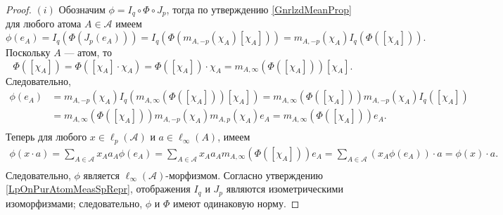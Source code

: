 \documentclass[12pt]{article}
\begin{document}
\begin{proof} 
    $(i)$ Обозначим $\phi=I_q\circ \Phi\circ J_p$, тогда по 
    утверждению \ref{GnrlzdMeanProp} для любого атома $A\in\mathcal{A}$ имеем
    \[
        \phi(e_A)
        =I_q(\Phi(J_p(e_A)))
        =I_q(\Phi(m_{A,-p}(\chi_A)[\chi_A]))
        =m_{A,-p}(\chi_A)I_q(\Phi([\chi_A])).
    \]
    Поскольку $A$ --- атом, то
    \[
        \Phi([\chi_A])
        =\Phi([\chi_A]\cdot\chi_A)
        =\Phi([\chi_A])\cdot\chi_A
        =m_{A,\infty}(\Phi([\chi_A]))[\chi_A].
    \]
    Следовательно,
    \[
    \begin{aligned}
        \phi(e_A)
        &=m_{A,-p}(\chi_A)I_q(m_{A,\infty}(\Phi([\chi_A]))[\chi_A]) 
        =m_{A,\infty}(\Phi([\chi_A]))m_{A,-p}(\chi_A)I_q([\chi_A]) \\
        &=m_{A,\infty}(\Phi([\chi_A]))m_{A,-p}(\chi_A)m_{A,p}(\chi_A)e_A 
        =m_{A,\infty}(\Phi([\chi_A]))e_A. \\
    \end{aligned}
    \]
    Теперь для любого $x\in\ell_p(\mathcal{A})$ и $a\in\ell_\infty(A)$, имеем
    \[
    \begin{aligned}
        \phi(x\cdot a)
        =\sum_{A\in\mathcal{A}} x_A a_A \phi(e_A) 
        =\sum_{A\in\mathcal{A}} x_A a_A m_{A,\infty}(\Phi([\chi_A]))e_A 
        =\sum_{A\in\mathcal{A}} (x_A \phi(e_A))\cdot a 
        =\phi(x)\cdot a. \\
    \end{aligned}
    \]
    Следовательно, $\phi$ является $\ell_\infty(\mathcal{A})$-морфизмом. 
    Согласно утверждению \ref{LpOnPurAtomMeasSpRepr}, отображения $I_q$ 
    и $J_p$ являются изометрическими изоморфизмами; следовательно, $\phi$ 
    и $\Phi$ имеют одинаковую норму.


\end{proof}
\end{document}
